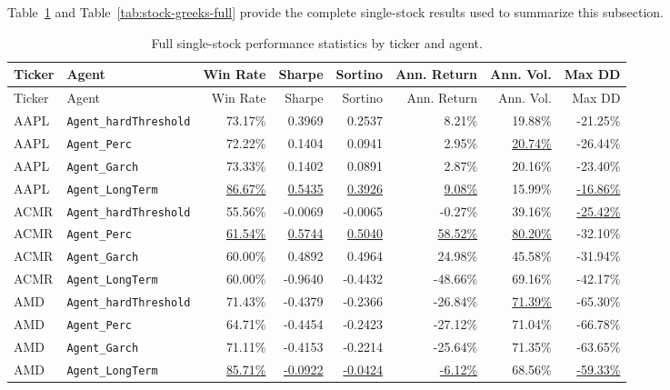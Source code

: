 ﻿\documentclass{article}
\begin{document}
Table~\ref{tab:stock-return-full} and Table~\ref{tab:stock-greeks-full} provide the complete single-stock results used to summarize this subsection.

\begingroup
\scriptsize
\setlength{\tabcolsep}{4pt}
\begin{longtable}{llrrrrrr}
\caption{Full single-stock performance statistics by ticker and agent.}\label{tab:stock-return-full} \\
\toprule
Ticker & Agent & Win Rate & Sharpe & Sortino & Ann. Return & Ann. Vol. & Max DD \\
\midrule
\endfirsthead

\toprule
Ticker & Agent & Win Rate & Sharpe & Sortino & Ann. Return & Ann. Vol. & Max DD \\
\midrule
\endhead

AAPL & \texttt{Agent\_hardThreshold} & 73.17\% & 0.3969 & 0.2537 & 8.21\% & 19.88\% & -21.25\% \\
AAPL & \texttt{Agent\_Perc}          & 72.22\% & 0.1404 & 0.0941 & 2.95\% & \underline{20.74\%} & -26.44\% \\
AAPL & \texttt{Agent\_Garch}         & 73.33\% & 0.1402 & 0.0891 & 2.87\% & 20.16\% & -23.40\% \\
AAPL & \texttt{Agent\_LongTerm}      & \underline{86.67\%} & \underline{0.5435} & \underline{0.3926} & \underline{9.08\%} & 15.99\% & \underline{-16.86\%} \\
\midrule
ACMR & \texttt{Agent\_hardThreshold} & 55.56\% & -0.0069 & -0.0065 & -0.27\% & 39.16\% & \underline{-25.42\%} \\
ACMR & \texttt{Agent\_Perc}          & \underline{61.54\%} & \underline{0.5744} & \underline{0.5040} & \underline{58.52\%} & \underline{80.20\%} & -32.10\% \\
ACMR & \texttt{Agent\_Garch}         & 60.00\% & 0.4892 & 0.4964 & 24.98\% & 45.58\% & -31.94\% \\
ACMR & \texttt{Agent\_LongTerm}      & 60.00\% & -0.9640 & -0.4432 & -48.66\% & 69.16\% & -42.17\% \\
\midrule
AMD  & \texttt{Agent\_hardThreshold} & 71.43\% & -0.4379 & -0.2366 & -26.84\% & \underline{71.39\%} & -65.30\% \\
AMD  & \texttt{Agent\_Perc}          & 64.71\% & -0.4454 & -0.2423 & -27.12\% & 71.04\% & -66.78\% \\
AMD  & \texttt{Agent\_Garch}         & 71.11\% & -0.4153 & -0.2214 & -25.64\% & 71.35\% & -63.65\% \\
AMD  & \texttt{Agent\_LongTerm}      & \underline{85.71\%} & \underline{-0.0922} & \underline{-0.0424} & \underline{-6.12\%} & 68.56\% & \underline{-59.33\%} \\

\end{longtable}
\end{document}
